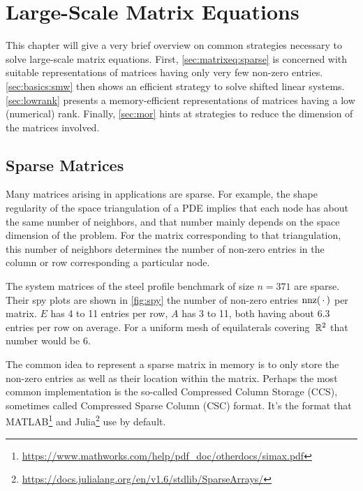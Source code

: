 \chapter{Large-Scale Matrix Equations}

This chapter will give a very brief overview on common strategies necessary to solve large-scale matrix equations.
First, \autoref{sec:matrixeq:sparse} is concerned with suitable representations of matrices having only very few non-zero entries.
\autoref{sec:basics:smw} then shows an efficient strategy to solve shifted linear systems.
\autoref{sec:lowrank} presents a memory-efficient representations of matrices having a low (numerical) rank.
Finally, \autoref{sec:mor} hints at strategies to reduce the dimension of the matrices involved.

\section{Sparse Matrices}
\label{sec:matrixeq:sparse}

Many matrices arising in applications are sparse.
For example, the shape regularity of the space triangulation of a \ac{PDE}
implies that each node has about the same number of neighbors,
and that number mainly depends on the space dimension of the problem.
For the matrix corresponding to that triangulation,
this number of neighbors determines the number of non-zero entries in the column or row corresponding a particular node.

\begin{example}
  The system matrices of the steel profile benchmark \cite{morwiki_steel} of size $n=371$ are sparse.
  Their spy plots are shown in \autoref{fig:spy} the number of non-zero entries $\nnz(\optional{})$ per matrix.
  $E$ has 4 to 11 entries per row, $A$ has 3 to 11, both having about \num{6.3} entries per row on average.
  For a uniform mesh of equilaterals covering~$\mathbb{R}^2$ that number would be \num{6}.
\end{example}

The common idea to represent a sparse matrix in memory is to only store the non-zero entries as well as their location within the matrix.
Perhaps the most common implementation is the so-called Compressed Column Storage (CCS),
sometimes called Compressed Sparse Column (CSC) format.
It's the format that \eg MATLAB\footnote{\url{https://www.mathworks.com/help/pdf_doc/otherdocs/simax.pdf}}
and Julia\footnote{\url{https://docs.julialang.org/en/v1.6/stdlib/SparseArrays/}} use by default.

